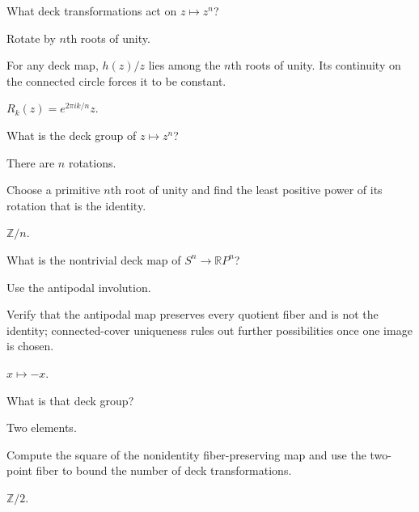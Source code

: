 \begin{exercise}\label{exr:viii12-08}
What deck transformations act on \(z\mapsto z^n\)?
\end{exercise}
\begin{hint}
Rotate by \(n\)th roots of unity.

For any deck map, \(h(z)/z\) lies among the \(n\)th roots of unity. Its continuity on the connected circle forces it to be constant.
\end{hint}
\begin{solution}
\(R_k(z)=e^{2\pi ik/n}z\).
\end{solution}

\begin{exercise}\label{exr:viii12-09}
What is the deck group of \(z\mapsto z^n\)?
\end{exercise}
\begin{hint}
There are \(n\) rotations.

Choose a primitive \(n\)th root of unity and find the least positive power of its rotation that is the identity.
\end{hint}
\begin{solution}
\(\mathbb Z/n\).
\end{solution}

\begin{exercise}\label{exr:viii12-10}
What is the nontrivial deck map of \(S^n\to\mathbb RP^n\)?
\end{exercise}
\begin{hint}
Use the antipodal involution.

Verify that the antipodal map preserves every quotient fiber and is not the identity; connected-cover uniqueness rules out further possibilities once one image is chosen.
\end{hint}
\begin{solution}
\(x\mapsto -x\).
\end{solution}

\begin{exercise}\label{exr:viii12-11}
What is that deck group?
\end{exercise}
\begin{hint}
Two elements.

Compute the square of the nonidentity fiber-preserving map and use the two-point fiber to bound the number of deck transformations.
\end{hint}
\begin{solution}
\(\mathbb Z/2\).
\end{solution}

